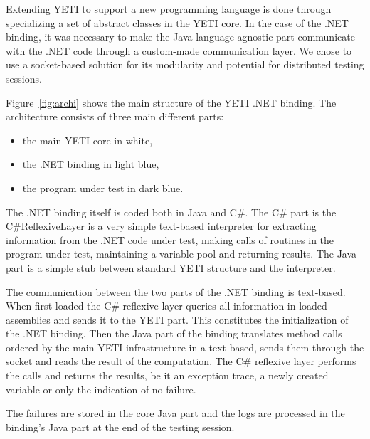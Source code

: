 Extending YETI to support a new programming language is done through specializing a set of abstract classes in the YETI core.
In the case of the .NET binding, it was necessary to make the Java language-agnostic part communicate with the .NET code through a custom-made communication layer. We chose to use a socket-based solution for its modularity and potential for distributed testing sessions.

Figure~\ref{fig:archi} shows the main structure of the YETI .NET binding. The architecture consists of three main different parts: 
\begin{itemize}
\item the main YETI core in white,
\item the .NET binding in light blue,
\item the program under test in dark blue.
\end{itemize} 

The .NET binding itself is coded both in Java and C\#. The C\# part is the C\#ReflexiveLayer is a very simple text-based interpreter for extracting information from the .NET code under test, making calls of routines in the program under test, maintaining a variable pool and returning results. The Java part is a simple stub between standard YETI structure and the interpreter. 

The communication between the two parts of the .NET binding is text-based.
When first loaded the C\# reflexive layer queries all information in loaded assemblies and sends it to the YETI part. This constitutes the initialization of the .NET binding.
Then the Java part of the binding translates method calls ordered
by the main YETI infrastructure in a text-based, sends them through the socket 
and reads the result of the computation. The C\# reflexive layer performs the calls 
and returns the results, be it an exception trace, a newly created variable or only the indication of no failure.

The failures are stored in the core Java part and the logs are processed in the binding's Java part at the end of the testing session.

